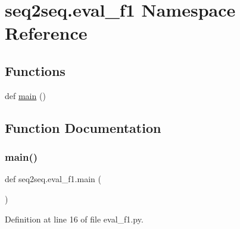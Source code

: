 \hypertarget{namespaceseq2seq_1_1eval__f1}{}\section{seq2seq.\+eval\+\_\+f1 Namespace Reference}
\label{namespaceseq2seq_1_1eval__f1}
\subsection*{Functions}
\begin{DoxyCompactItemize}
\item 
def \hyperlink{namespaceseq2seq_1_1eval__f1_a99ede4f55975fd62d1d5834b72fa03c7}{main} ()
\end{DoxyCompactItemize}


\subsection{Function Documentation}
\mbox{\label{namespaceseq2seq_1_1eval__f1_a99ede4f55975fd62d1d5834b72fa03c7}} 
\subsubsection{\texorpdfstring{main()}{main()}}
{\footnotesize\ttfamily def seq2seq.\+eval\+\_\+f1.\+main (\begin{DoxyParamCaption}{ }\end{DoxyParamCaption})}



Definition at line 16 of file eval\+\_\+f1.\+py.


